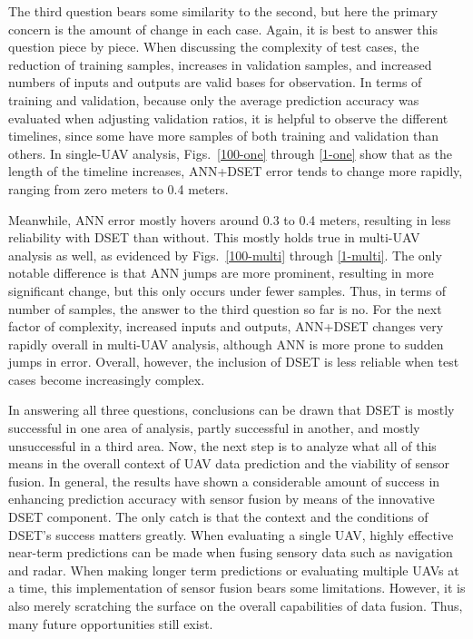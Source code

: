 \documentclass[12pt]{uthesis-v12}  %
\begin{document}
The third question bears some similarity to the second, but here the primary concern is the amount of change in each case. Again, it is best to answer this question piece by piece. When discussing the complexity of test cases, the reduction of training samples, increases in validation samples, and increased numbers of inputs and outputs are valid bases for observation. In terms of training and validation, because only the average prediction accuracy was evaluated when adjusting validation ratios, it is helpful to observe the different timelines, since some have more samples of both training and validation than others. In single-UAV analysis, Figs.~\ref{100-one} through \ref{1-one} show that as the length of the timeline increases, ANN+DSET error tends to change more rapidly, ranging from zero meters to 0.4 meters. 

Meanwhile, ANN error mostly hovers around 0.3 to 0.4 meters, resulting in less reliability with DSET than without. This mostly holds true in multi-UAV analysis as well, as evidenced by Figs.~\ref{100-multi} through \ref{1-multi}. The only notable difference is that ANN jumps are more prominent, resulting in more significant change, but this only occurs under fewer samples. Thus, in terms of number of samples, the answer to the third question so far is no. For the next factor of complexity, increased inputs and outputs, ANN+DSET changes very rapidly overall in multi-UAV analysis, although ANN is more prone to sudden jumps in error. Overall, however, the inclusion of DSET is less reliable when test cases become increasingly complex.

In answering all three questions, conclusions can be drawn that DSET is mostly successful in one area of analysis, partly successful in another, and mostly unsuccessful in a third area. Now, the next step is to analyze what all of this means in the overall context of UAV data prediction and the viability of sensor fusion. In general, the results have shown a considerable amount of success in enhancing prediction accuracy with sensor fusion by means of the innovative DSET component. The only catch is that the context and the conditions of DSET's success matters greatly. When evaluating a single UAV, highly effective near-term predictions can be made when fusing sensory data such as navigation and radar. When making longer term predictions or evaluating multiple UAVs at a time, this implementation of sensor fusion bears some limitations. However, it is also merely scratching the surface on the overall capabilities of data fusion. Thus, many future opportunities still exist.
\end{document}

